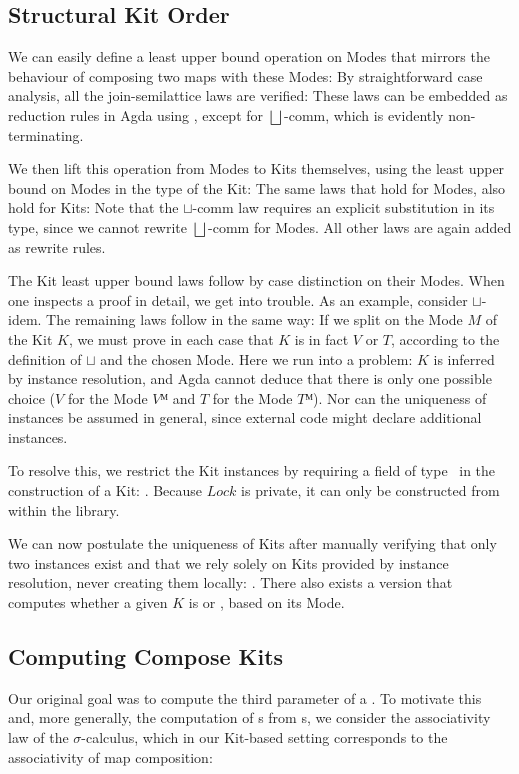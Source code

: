 \documentclass[screen,nonacm]{acmart}
\begin{document}
\subsection{Structural Kit Order}\label{sec:ags-sko}
We can easily define a least upper bound operation on Modes that mirrors the
behaviour of composing two maps with these Modes: \AModeLub{} By
straightforward case analysis, all the join-semilattice laws are verified:
\AModeLubLaws{} These laws can be embedded as reduction rules in Agda using
, except for $\bigsqcup$-comm, which is evidently
non-terminating.

We then lift this operation from Modes to Kits themselves, using the least
upper bound on Modes in the type of the Kit: \AKitLub{} The same laws that hold
for Modes, also hold for Kits: \AKitLubLaws{} Note that the $\sqcup$-comm law
requires an explicit substitution in its type, since we cannot rewrite
$\bigsqcup$-comm for Modes. All other laws are again added as rewrite rules.

The Kit least upper bound laws follow by case distinction on their Modes. When
one inspects a proof in detail, we get into trouble. As an example, consider
$\sqcup$-idem. The remaining laws follow in the same way: \AKitLubExcerpt{} If
we split on the Mode $M$ of the Kit $K$, we must prove in each case that $K$ is
in fact $V$ or $T$, according to the definition of $\sqcup$ and the chosen
Mode. Here we run into a problem: $K$ is inferred by instance resolution, and
Agda cannot deduce that there is only one possible choice ($V$ for the Mode
$Vᴹ$ and $T$ for the Mode $Tᴹ$). Nor can the uniqueness of instances be assumed
in general, since external code might declare additional instances.

To resolve this, we restrict the Kit instances by requiring a field of type
\ALock \ in the construction of a Kit: \ALockField{}. Because $Lock$ is
private, it can only be constructed from within the library.

We can now postulate the uniqueness of Kits after manually verifying that only
two instances exist and that we rely solely on Kits provided by instance
resolution, never creating them locally: \AUniqueKits{}. There also exists a
version  that computes whether a given $K$ is
 or , based on its Mode.

\subsection{Computing Compose Kits}\label{sec:ags-cck}
Our original goal was to compute the third parameter of a
. To motivate this and, more generally, the
computation of s from s, we consider
the associativity law of the $\sigma$-calculus, which in our Kit-based setting
corresponds to the associativity of map composition: \AAssocTryO{}
\end{document}
